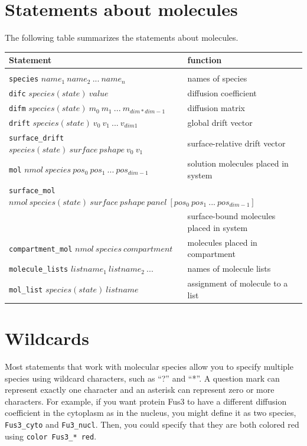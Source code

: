 \documentclass {scrbook}
\newcommand {\ttt} {\texttt}
\begin{document}
\section{Statements about molecules}

The following table summarizes the statements about molecules.

\begin{longtable}[c]{ll}
Statement & function\\
\hline \\
\ttt{species} $name_1\ name_2\ ...\ name_n$ & names of species\\
\ttt{difc} $species(state)\ value$ & diffusion coefficient\\
\ttt{difm} $species(state)\ m_0\ m_1\ ...\ m_{dim*dim-1}$ & diffusion matrix\\
\ttt{drift} $species(state)\ v_0\ v_1\ ...\ v_{dim1}$ & global drift vector\\
\ttt{surface\_drift} $species(state)\ surface\ pshape\ v_0\ v_1$ & surface-relative drift vector\\
\ttt{mol} $nmol\ species\ pos_0\ pos_1\ ...\ pos_{dim-1}$ & solution molecules placed in system\\
\multicolumn{2}{l}{
\ttt{surface\_mol} $nmol\ species(state)\ surface\ pshape\ panel\ [pos_0\ pos_1\ ...\ pos_{dim-1}]$}\\
 & surface-bound molecules placed in system\\
\ttt{compartment\_mol} $nmol\ species\ compartment$ & molecules placed in compartment\\
\ttt{molecule\_lists} $listname_1\ listname_2\ ...$ & names of molecule lists\\
\ttt{mol\_list} $species(state)\ listname$ & assignment of molecule to a list
\end{longtable}

\section{Wildcards}

Most statements that work with molecular species allow you to specify multiple species using wildcard characters, such as ``?'' and ``*''. A question mark can represent exactly one character and an asterisk can represent zero or more characters. For example, if you want protein Fus3 to have a different diffusion coefficient in the cytoplasm as in the nucleus, you might define it as two species, \ttt{Fus3\_cyto} and \ttt{Fu3\_nucl}. Then, you could specify that they are both colored red using \ttt{color Fus3\_* red}.
\end{document}
